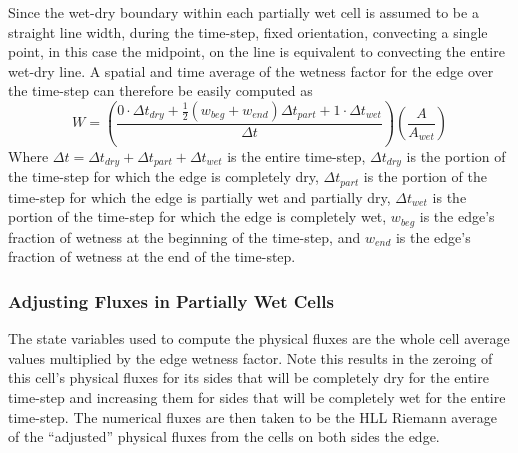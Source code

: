 \documentclass[letterpaper,10pt]{article}
\begin{document}
Since the wet-dry boundary within each partially wet cell is assumed 
to be a straight line width, during the time-step, fixed orientation, 
convecting a single point, in this case the midpoint, on the line is 
equivalent to convecting the entire wet-dry line.  A spatial and time 
average of the wetness factor for the edge over the time-step can 
therefore be easily computed as
\begin{equation}
W=\left(\frac{0\cdot\Delta t_{dry} +\frac{1}{2}(w_{beg}+w_{end})\Delta t_{part}+1\cdot\Delta t_{wet}}{\Delta t}\right) \left(\frac{A}{A_{wet}}\right)
\label{wetnessfactor}
\end{equation}
Where $\Delta t=\Delta t_{dry}+\Delta t_{part}+\Delta t_{wet}$ is the 
entire time-step, $\Delta t_{dry}$ is the portion of the time-step for 
which the edge is completely dry, $\Delta t_{part}$ is the portion of 
the time-step for which the edge is partially wet and partially dry, 
$\Delta t_{wet}$ is the portion of the time-step for which the edge is 
completely wet, $w_{beg}$ is the edge's fraction of wetness at the 
beginning of the time-step, and $w_{end}$ is the edge's fraction of 
wetness at the end of the time-step.\newline

\subsubsection{Adjusting Fluxes in Partially Wet Cells} \label{adjustfluxes}

The state variables used to compute the physical fluxes are the whole
cell average values multiplied by the edge wetness factor.  Note this 
results in the zeroing of this cell's physical fluxes for its sides 
that will be completely dry for the entire time-step and increasing 
them for sides that will be completely wet for the entire time-step.   
The numerical fluxes are then taken to be the HLL Riemann average of 
the ``adjusted'' physical fluxes from the cells on both sides the edge.  \newline
\end{document}
